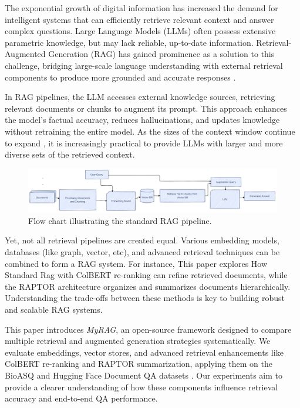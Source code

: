 \documentclass{scrartcl}
\begin{document}
The exponential growth of digital information has increased the demand for intelligent systems that can efficiently retrieve relevant context and answer complex questions. Large Language Models (LLMs) often possess extensive parametric knowledge, but may lack reliable, up-to-date information. Retrieval-Augmented Generation (RAG) has gained prominence as a solution to this challenge, bridging large-scale language understanding with external retrieval components to produce more grounded and accurate responses \cite{lewis2020retrieval, guu2020realm}.

In RAG pipelines, the LLM accesses external knowledge sources, retrieving relevant documents or chunks to augment its prompt. This approach enhances the model’s factual accuracy, reduces hallucinations, and updates knowledge without retraining the entire model. As the sizes of the context window continue to expand \cite{liu2023lost}, it is increasingly practical to provide LLMs with larger and more diverse sets of the retrieved context.

\begin{figure}[h]
    \centering
    \includegraphics[width=\linewidth]{StandardRag.pdf} 
    \caption{Flow chart illustrating the standard RAG pipeline.}
    \label{fig:standard_rag_flow}
\end{figure}


Yet, not all retrieval pipelines are created equal. Various embedding models, databases (like graph, vector, etc), and advanced retrieval techniques can be combined to form a RAG system. For instance, This paper explores How Standard Rag with ColBERT \cite{khattab2020colbert} re-ranking can refine retrieved documents, while the RAPTOR architecture \cite{wu2021recursively, raptor2024} organizes and summarizes documents hierarchically. Understanding the trade-offs between these methods is key to building robust and scalable RAG systems.

This paper introduces \textit{MyRAG}, an open-source framework designed to compare multiple retrieval and augmented generation strategies systematically. We evaluate embeddings, vector stores, and advanced retrieval enhancements like ColBERT re-ranking and RAPTOR summarization, applying them on the BioASQ \cite{bioasq2023} and Hugging Face Document QA datasets \cite{huggingface2024docqa}. Our experiments aim to provide a clearer understanding of how these components influence retrieval accuracy and end-to-end QA performance.
\end{document}
